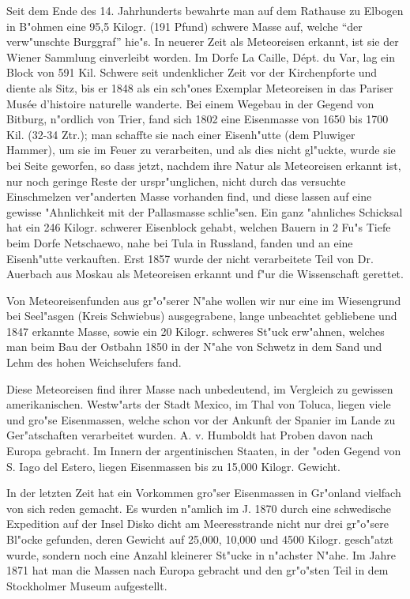 \documentclass[a4paper, 11pt, oneside, german]{article}
\begin{document}
Seit dem Ende des 14. Jahrhunderts bewahrte man auf dem Rathause zu Elbogen in B"ohmen eine 95,5 Kilogr. (191 Pfund) schwere Masse auf, welche "`der verw"unschte Burggraf"' hie"s. In neuerer Zeit als Meteoreisen erkannt, ist sie der Wiener Sammlung einverleibt worden. Im Dorfe La Caille, Dépt. du Var, lag ein Block von 591 Kil. Schwere seit undenklicher Zeit vor der Kirchenpforte und diente als Sitz, bis er 1848 als ein sch"ones Exemplar Meteoreisen in das Pariser Musée d'histoire naturelle wanderte. Bei einem Wegebau in der Gegend von Bitburg, n"ordlich von Trier, fand sich 1802 eine Eisenmasse von 1650 bis 1700 Kil. (32-34 Ztr.); man schaffte sie nach einer Eisenh"utte (dem Pluwiger Hammer), um sie im Feuer zu verarbeiten, und als dies nicht gl"uckte, wurde sie bei Seite geworfen, so dass jetzt, nachdem ihre Natur als Meteoreisen erkannt ist, nur noch geringe Reste der urspr"unglichen, nicht durch das versuchte Einschmelzen ver"anderten Masse vorhanden find, und diese lassen auf eine gewisse "Ahnlichkeit mit der Pallasmasse schlie"sen. Ein ganz "ahnliches Schicksal hat ein 246 Kilogr. schwerer Eisenblock gehabt, welchen Bauern in 2 Fu"s Tiefe beim Dorfe Netschaewo, nahe bei Tula in Russland, fanden und an eine Eisenh"utte verkauften. Erst 1857 wurde der nicht verarbeitete Teil von Dr. Auerbach aus Moskau als Meteoreisen erkannt und f"ur die Wissenschaft gerettet.

Von Meteoreisenfunden aus gr"o"serer N"ahe wollen wir nur eine im Wiesengrund bei Seel"asgen (Kreis Schwiebus) ausgegrabene, lange unbeachtet gebliebene und 1847 erkannte Masse, sowie ein 20 Kilogr. schweres St"uck erw"ahnen, welches man beim Bau der Ostbahn 1850 in der N"ahe von Schwetz in dem Sand und Lehm des hohen Weichselufers fand.

Diese Meteoreisen find ihrer Masse nach unbedeutend, im Vergleich zu gewissen amerikanischen. Westw"arts der Stadt Mexico, im Thal von Toluca, liegen viele und gro"se Eisenmassen, welche schon vor der Ankunft der Spanier im Lande zu Ger"atschaften verarbeitet wurden. A. v. Humboldt hat Proben davon nach Europa gebracht. Im Innern der argentinischen Staaten, in der "oden Gegend von S. Iago del Estero, liegen Eisenmassen bis zu 15,000 Kilogr. Gewicht.

In der letzten Zeit hat ein Vorkommen gro"ser Eisenmassen in Gr"onland vielfach von sich reden gemacht. Es wurden n"amlich im J. 1870 durch eine schwedische Expedition auf der Insel Disko dicht am Meeresstrande nicht nur drei gr"o"sere Bl"ocke gefunden, deren Gewicht auf 25,000, 10,000 und 4500 Kilogr. gesch"atzt wurde, sondern noch eine Anzahl kleinerer St"ucke in n"achster N"ahe. Im Jahre 1871 hat man die Massen nach Europa gebracht und den gr"o"sten Teil in dem Stockholmer Museum aufgestellt.
\end{document}
